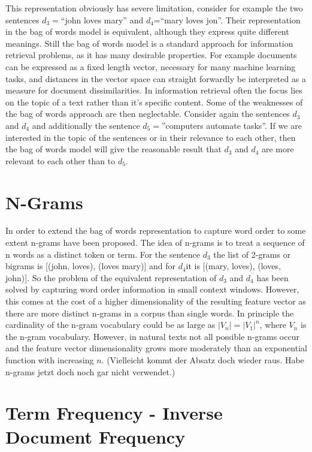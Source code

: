 \documentclass[Thesis.tex]{subfiles}
\begin{document}
This representation obviously has severe limitation, consider for example
the two sentences $d_{3}=$``john loves mary'' and $d_{4}$=``mary
loves jon''. Their representation in the bag of words model is equivalent,
although they express quite different meanings. Still the bag of words
model is a standard approach for information retrieval problems, as
it has many desirable properties. For example documents can be expressed
as a fixed length vector, necessary for many machine learning tasks,
and distances in the vector space can straight forwardly be interpreted
as a measure for document dissimilarities. In information retrieval often
the focus lies on the topic of a text rather than it's specific content.
Some of the weaknesses of the bag of words approach are then neglectable.
Consider again the sentences $d_{3}$ and $d_{4}$ and additionally
the sentence $d_{5}=$''computers automate tasks''. If we are interested
in the topic of the sentences or in their relevance to each other,
then the bag of words model will give the reasonable result that $d_{3}$
and $d_{4}$ are more relevant to each other than to $d_{5}$.


\section{N-Grams}

In order to extend the bag of words representation to capture word
order to some extent n-grams have been proposed. The idea of n-grams
is to treat a sequence of n words as a distinct token or term. For
the sentence $d_{3}$ the list of 2-grams or bigrams is {[}(john,
loves), (loves mary){]} and for $d_{4}$it is {[}(mary, loves), (loves,
john){]}. So the problem of the equivalent representation of $d_{3}$
and $d_{4}$ has been solved by capturing word order information in
small context windows. However, this comes at the cost of a higher
dimensionality of the resulting feature vector as there are more distinct
n-grams in a corpus than single words. In principle the cardinality
of the n-gram vocabulary could be as large as $|V_{n}|=|V_{1}|^{n}$,
where $V_{n}$ is the n-gram vocabulary. However, in natural texts
not all possible n-grams occur and the feature vector dimensionality
grows more moderately than an exponential function with increasing
$n$.   (Vielleicht kommt der Absatz doch wieder raus. Habe n-grams jetzt doch noch gar nicht verwendet.)


\section{Term Frequency - Inverse Document Frequency}
\end{document}
